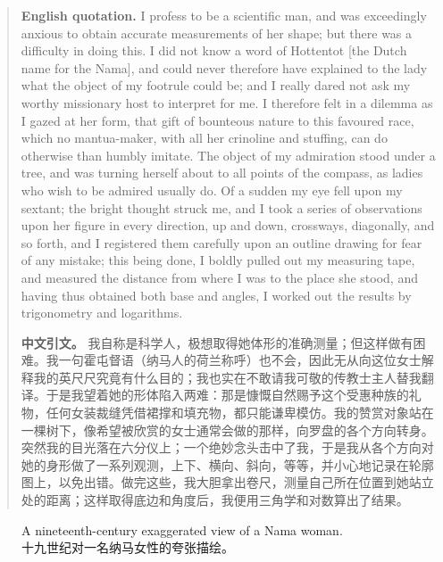 \begin{quote}
\noindent\textbf{English quotation.} I profess to be a scientific man, and was exceedingly anxious to obtain accurate measurements of her shape; but there was a difficulty in doing this. I did not know a word of Hottentot [the Dutch name for the Nama], and could never therefore have explained to the lady what the object of my footrule could be; and I really dared not ask my worthy missionary host to interpret for me. I therefore felt in a dilemma as I gazed at her form, that gift of bounteous nature to this favoured race, which no mantua-maker, with all her crinoline and stuffing, can do otherwise than humbly imitate. The object of my admiration stood under a tree, and was turning herself about to all points of the compass, as ladies who wish to be admired usually do. Of a sudden my eye fell upon my sextant; the bright thought struck me, and I took a series of observations upon her figure in every direction, up and down, crossways, diagonally, and so forth, and I registered them carefully upon an outline drawing for fear of any mistake; this being done, I boldly pulled out my measuring tape, and measured the distance from where I was to the place she stood, and having thus obtained both base and angles, I worked out the results by trigonometry and logarithms.

\smallskip
\noindent\textbf{中文引文。} 我自称是科学人，极想取得她体形的准确测量；但这样做有困难。我一句霍屯督语（纳马人的荷兰称呼）也不会，因此无从向这位女士解释我的英尺尺究竟有什么目的；我也实在不敢请我可敬的传教士主人替我翻译。于是我望着她的形体陷入两难：那是慷慨自然赐予这个受惠种族的礼物，任何女装裁缝凭借裙撑和填充物，都只能谦卑模仿。我的赞赏对象站在一棵树下，像希望被欣赏的女士通常会做的那样，向罗盘的各个方向转身。突然我的目光落在六分仪上；一个绝妙念头击中了我，于是我从各个方向对她的身形做了一系列观测，上下、横向、斜向，等等，并小心地记录在轮廓图上，以免出错。做完这些，我大胆拿出卷尺，测量自己所在位置到她站立处的距离；这样取得底边和角度后，我便用三角学和对数算出了结果。
\end{quote}

\begin{figure}[htbp]
\centering
{}
\caption{A nineteenth-century exaggerated view of a Nama woman.\\十九世纪对一名纳马女性的夸张描绘。}
\end{figure}

